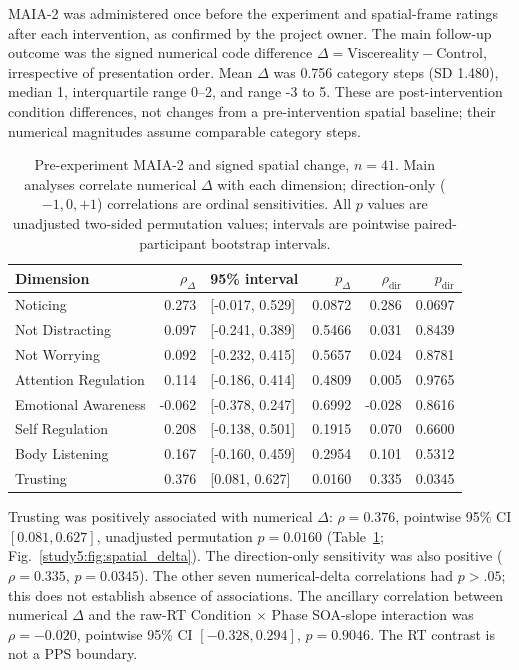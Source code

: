 MAIA-2 was administered once before the experiment and spatial-frame ratings after each intervention, as confirmed by the project owner. The main follow-up outcome was the signed numerical code difference $\Delta=\mathrm{Viscereality}-\mathrm{Control}$, irrespective of presentation order. Mean $\Delta$ was 0.756 category steps (SD 1.480), median 1, interquartile range 0--2, and range -3 to 5. These are post-intervention condition differences, not changes from a pre-intervention spatial baseline; their numerical magnitudes assume comparable category steps.

\begin{table}[htbp]
\centering\small
\begin{tabular}{lrlrrr}
\hline
Dimension & $\rho_\Delta$ & 95\% interval & $p_\Delta$ & $\rho_\mathrm{dir}$ & $p_\mathrm{dir}$ \\
\hline
Noticing & 0.273 & [-0.017, 0.529] & 0.0872 & 0.286 & 0.0697 \\
Not Distracting & 0.097 & [-0.241, 0.389] & 0.5466 & 0.031 & 0.8439 \\
Not Worrying & 0.092 & [-0.232, 0.415] & 0.5657 & 0.024 & 0.8781 \\
Attention Regulation & 0.114 & [-0.186, 0.414] & 0.4809 & 0.005 & 0.9765 \\
Emotional Awareness & -0.062 & [-0.378, 0.247] & 0.6992 & -0.028 & 0.8616 \\
Self Regulation & 0.208 & [-0.138, 0.501] & 0.1915 & 0.070 & 0.6600 \\
Body Listening & 0.167 & [-0.160, 0.459] & 0.2954 & 0.101 & 0.5312 \\
Trusting & 0.376 & [0.081, 0.627] & 0.0160 & 0.335 & 0.0345 \\
\hline
\end{tabular}
\caption{Pre-experiment MAIA-2 and signed spatial change, $n=41$. Main analyses correlate numerical $\Delta$ with each dimension; direction-only ($-1,0,+1$) correlations are ordinal sensitivities. All $p$ values are unadjusted two-sided permutation values; intervals are pointwise paired-participant bootstrap intervals.}
\label{study5:tab:spatial_delta}
\end{table}

Trusting was positively associated with numerical $\Delta$: $\rho=0.376$, pointwise 95\% CI $[0.081,0.627]$, unadjusted permutation $p=0.0160$ (Table~\ref{study5:tab:spatial_delta}; Fig.~\ref{study5:fig:spatial_delta}). The direction-only sensitivity was also positive ($\rho=0.335$, $p=0.0345$). The other seven numerical-delta correlations had $p>.05$; this does not establish absence of associations. The ancillary correlation between numerical $\Delta$ and the raw-RT Condition $\times$ Phase SOA-slope interaction was $\rho=-0.020$, pointwise 95\% CI $[-0.328,0.294]$, $p=0.9046$. The RT contrast is not a PPS boundary.

